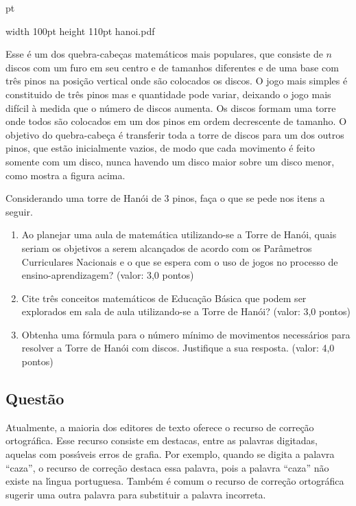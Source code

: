 \documentclass{report}
\begin{document}
 pt

\pdfximage width 100pt height 110pt {hanoi.pdf}

\centerline{\pdfrefximage\pdflastximage}

Esse \'e um dos quebra-cabe\c cas matem\'aticos mais populares, que consiste de $n$ discos com um furo em seu centro e de tamanhos diferentes e de uma base com tr\^es pinos na posi\c c\~ao vertical onde s\~ao colocados os discos. O jogo mais simples \'e constituido de tr\^es pinos mas e quantidade pode variar, deixando o jogo mais dif\'icil \`a medida que o n\'umero de discos aumenta. Os discos formam uma torre onde todos s\~ao colocados em um dos pinos em ordem decrescente de tamanho. O objetivo do quebra-cabe\c ca \'e transferir toda a torre de discos para um dos outros pinos, que est\~ao inicialmente vazios, de modo que cada movimento \'e feito somente com um disco, nunca havendo um disco maior sobre um disco menor, como mostra a figura acima.

Considerando uma torre de Han\'oi de 3 pinos, fa\c ca o que se pede nos itens a seguir.

\begin{enumerate}

\item[(a)] Ao planejar uma aula de matem\'atica utilizando-se a Torre de Han\'oi, quais seriam os objetivos a serem alcan\c cados de acordo com os Par\^ametros Curriculares Nacionais e o que se espera com o uso de jogos no processo de ensino-aprendizagem? (valor: 3,0 pontos)

\item[(b)] Cite tr\^es conceitos matem\'aticos de Educa\c c\~ao B\'asica que podem ser explorados em sala de aula utilizando-se a Torre de Han\'oi? (valor: 3,0 pontos)

\item[(c)] Obtenha uma f\'ormula para o n\'umero m\'inimo de movimentos necess\'arios para resolver a Torre de Han\'oi com discos. Justifique a sua resposta. (valor: 4,0 pontos)

\end{enumerate}

\subsection{\color{blue} Quest\~ao }

Atualmente, a maioria dos editores de texto oferece o recurso de corre\c c\~ao ortogr\'afica. Esse recurso consiste em destacas, entre as palavras digitadas, aquelas com poss\'\i veis erros de grafia. Por exemplo, quando se digita a palavra ``caza'', o recurso de corre\c c\~ao destaca essa palavra, pois a palavra ``caza'' n\~ao existe na l\'\i ngua portuguesa. Tamb\'em \'e comum o recurso de corre\c c\~ao ortogr\'afica sugerir uma outra palavra para substituir a palavra incorreta.
\end{document}
